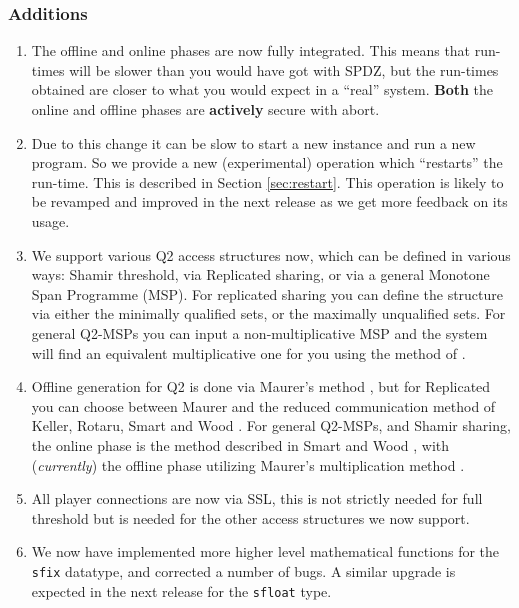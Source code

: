 \subsubsection{Additions}
\begin{enumerate}
\item The offline and online phases are now fully integrated.
This means that run-times will be slower than you would have got
with SPDZ, but the run-times obtained are closer to what you would
expect in a ``real'' system.
{\bf Both} the online and offline phases are {\bf actively} secure
with abort.
\item Due to this change it can be slow to start a new instance
and run a new program. So we provide a new (experimental) operation which
``restarts'' the run-time. This is described in Section \ref{sec:restart}.
This operation is likely to be revamped and improved in the next
release as we get more feedback on its usage.
\item We support various Q2 access structures now, which can be
defined in various ways: Shamir threshold, via Replicated sharing,
or via a general Monotone Span Programme (MSP).
For replicated sharing you can define the structure
via either the minimally qualified sets, or the maximally unqualified
sets.
For general Q2-MSPs you can input a non-multiplicative MSP and the
system will find an equivalent multiplicative one for you using the
method of \cite{CDM00}.
\item Offline generation for Q2 is done via Maurer's method \cite{Maurer}, but
for Replicated you can choose between Maurer and the reduced communication
method of Keller, Rotaru, Smart and Wood \cite{KRSW}.
For general Q2-MSPs, and Shamir sharing, the online phase is the method described in Smart and Wood \cite{SW18},
with ({\em currently}) the offline phase utilizing Maurer's multiplication method \cite{Maurer}.
\item All player connections are now via SSL, this is not strictly
needed for full threshold but is needed for the other access structures
we now support.
\item We now have implemented more higher level mathematical functions for
the \verb+sfix+ datatype, and corrected a number of bugs.
A similar upgrade is expected in the next release for the \verb+sfloat+ type.
\end{enumerate}


